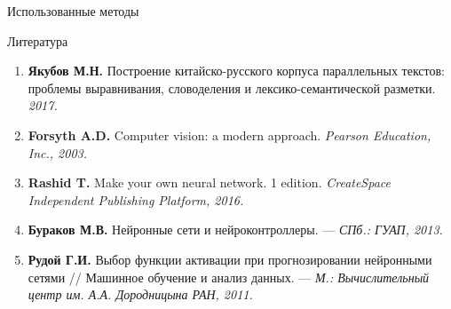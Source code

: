 \documentclass[final]{beamer}
\newlength{\onecolwid}
\begin{document}
\begin{frame}
\begin{columns}[t]
\begin{column}{\onecolwid}
\begin{exampleblock}{Использованные методы}
\end{exampleblock}


\begin{exampleblock}{Литература}

\begin{enumerate}
\item \textbf{Якубов М.Н.} Построение китайско-русского корпуса параллельных текстов: проблемы выравнивания, словоделения и лексико-семантической разметки. \textit{2017.}
\item \textbf{Forsyth A.D.} Computer vision: a modern approach.\textit{ Pearson Education, Inc., 2003.}
\item \textbf{Rashid T.} Make your own neural network. 1 edition.\textit{ CreateSpace Independent Publishing Platform, 2016.}
\item \textbf{Бураков М.В.} Нейронные сети и нейроконтроллеры. — \textit{СПб.: ГУАП, 2013.}
\item  \textbf{Рудой Г.И.} Выбор функции активации при прогнозировании нейронными сетями // Машинное обучение и анализ данных. —\textit{ М.: Вычислительный центр им. А.А. Дородницына РАН, 2011.}
\end{enumerate}
\end{exampleblock}







\end{column}
\end{columns}
\end{frame}
\end{document}
